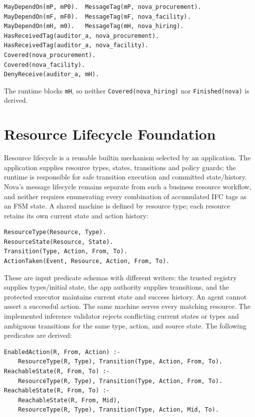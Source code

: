 \documentclass[10pt]{article}
\begin{document}
\begin{lstlisting}
MayDependOn(mP, mP0).  MessageTag(mP, nova_procurement).
MayDependOn(mF, mF0).  MessageTag(mF, nova_facility).
MayDependOn(mH, m0).   MessageTag(mH, nova_hiring).
HasReceivedTag(auditor_a, nova_procurement).
HasReceivedTag(auditor_a, nova_facility).
Covered(nova_procurement).
Covered(nova_facility).
DenyReceive(auditor_a, mH).
\end{lstlisting}

The runtime blocks \texttt{mH}, so neither \texttt{Covered(nova\_hiring)} nor
\texttt{Finished(nova)} is derived.


\section{Resource Lifecycle Foundation}

Resource lifecycle is a reusable builtin mechanism selected by an application. The
application supplies resource types, states, transitions and policy guards; the runtime
is responsible for safe transition execution and committed state/history. Nova's
message lifecycle remains separate from such a business resource workflow, and neither
requires enumerating every combination of accumulated IFC tags as an FSM state.
A shared machine is defined by resource type; each resource retains its own current
state and action history:
\begin{lstlisting}
ResourceType(Resource, Type).
ResourceState(Resource, State).
Transition(Type, Action, From, To).
ActionTaken(Event, Resource, Action, From, To).
\end{lstlisting}
These are input predicate schemas with different writers: the trusted registry supplies
types/initial state, the app authority supplies transitions, and the protected executor
maintains current state and success history. An agent cannot assert a successful action.
The same machine serves every matching resource. The implemented inference validator
rejects conflicting current states or types and ambiguous transitions for the same
type, action, and source state. The following predicates are derived:

\begin{lstlisting}
EnabledAction(R, From, Action) :-
    ResourceType(R, Type), Transition(Type, Action, From, To).
ReachableState(R, From, To) :-
    ResourceType(R, Type), Transition(Type, Action, From, To).
ReachableState(R, From, To) :-
    ReachableState(R, From, Mid),
    ResourceType(R, Type), Transition(Type, Action, Mid, To).
\end{lstlisting}
\end{document}
